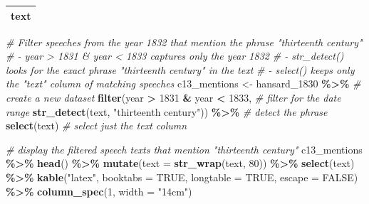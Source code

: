 \documentclass[
]{article}
\newenvironment{Shaded}{\begin{snugshade}}{\end{snugshade}}
\newcommand{\AttributeTok}[1]{\textcolor[rgb]{0.13,0.29,0.53}{#1}}
\newcommand{\CommentTok}[1]{\textcolor[rgb]{0.56,0.35,0.01}{\textit{#1}}}
\newcommand{\ConstantTok}[1]{\textcolor[rgb]{0.56,0.35,0.01}{#1}}
\newcommand{\DecValTok}[1]{\textcolor[rgb]{0.00,0.00,0.81}{#1}}
\newcommand{\FunctionTok}[1]{\textcolor[rgb]{0.13,0.29,0.53}{\textbf{#1}}}
\newcommand{\NormalTok}[1]{#1}
\newcommand{\OtherTok}[1]{\textcolor[rgb]{0.56,0.35,0.01}{#1}}
\newcommand{\SpecialCharTok}[1]{\textcolor[rgb]{0.81,0.36,0.00}{\textbf{#1}}}
\newcommand{\StringTok}[1]{\textcolor[rgb]{0.31,0.60,0.02}{#1}}
\begin{document}
\begin{longtable}{>{\raggedright\arraybackslash}p{14cm}}
\toprule
text\\


\bottomrule
\end{longtable}

\begin{Shaded}
\begin{Highlighting}[]
\CommentTok{\# Filter speeches from the year 1832 that mention the phrase "thirteenth century"}
\CommentTok{\# {-} year \textgreater{} 1831 \& year \textless{} 1833 captures only the year 1832}
\CommentTok{\# {-} str\_detect() looks for the exact phrase "thirteenth century" in the text}
\CommentTok{\# {-} select() keeps only the "text" column of matching speeches}
\NormalTok{c13\_mentions }\OtherTok{\textless{}{-}}\NormalTok{ hansard\_1830 }\SpecialCharTok{\%\textgreater{}\%} \CommentTok{\# create a new dataset}
  \FunctionTok{filter}\NormalTok{(year }\SpecialCharTok{\textgreater{}} \DecValTok{1831} \SpecialCharTok{\&}\NormalTok{ year }\SpecialCharTok{\textless{}} \DecValTok{1833}\NormalTok{, }\CommentTok{\# filter for the date range}
         \FunctionTok{str\_detect}\NormalTok{(text, }\StringTok{"thirteenth century"}\NormalTok{)) }\SpecialCharTok{\%\textgreater{}\%} \CommentTok{\# detect the phrase}
  \FunctionTok{select}\NormalTok{(text) }\CommentTok{\# select just the text column}
\end{Highlighting}
\end{Shaded}

\begin{Shaded}
\begin{Highlighting}[]
\CommentTok{\# display the filtered speech texts that mention "thirteenth century"}
\NormalTok{c13\_mentions }\SpecialCharTok{\%\textgreater{}\%}
  \FunctionTok{head}\NormalTok{() }\SpecialCharTok{\%\textgreater{}\%}
  \FunctionTok{mutate}\NormalTok{(}\AttributeTok{text =} \FunctionTok{str\_wrap}\NormalTok{(text, }\DecValTok{80}\NormalTok{)) }\SpecialCharTok{\%\textgreater{}\%}
  \FunctionTok{select}\NormalTok{(text) }\SpecialCharTok{\%\textgreater{}\%}
  \FunctionTok{kable}\NormalTok{(}\StringTok{"latex"}\NormalTok{, }\AttributeTok{booktabs =} \ConstantTok{TRUE}\NormalTok{, }\AttributeTok{longtable =} \ConstantTok{TRUE}\NormalTok{, }\AttributeTok{escape =} \ConstantTok{FALSE}\NormalTok{) }\SpecialCharTok{\%\textgreater{}\%}
  \FunctionTok{column\_spec}\NormalTok{(}\DecValTok{1}\NormalTok{, }\AttributeTok{width =} \StringTok{"14cm"}\NormalTok{)}
\end{Highlighting}
\end{Shaded}
\end{document}
